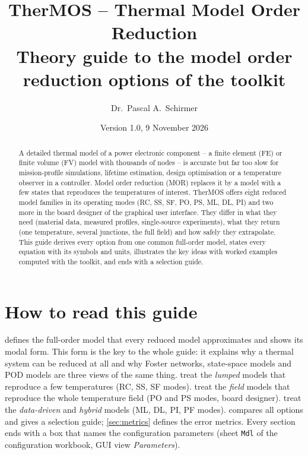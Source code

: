 \documentclass[11pt,a4paper]{article}
\title{\textbf{TherMOS -- Thermal Model Order Reduction}\\[0.3em]
  \large Theory guide to the model order reduction options of the toolkit}
\author{Dr.\ Pascal A.\ Schirmer}
\date{Version 1.0, 9 November 2026}
\newcommand{\cfg}[1]{\texttt{#1}}
\begin{document}
\maketitle

\begin{abstract}
\noindent
A detailed thermal model of a power electronic component -- a finite element (FE) or finite volume (FV) model with
thousands of nodes -- is accurate but far too slow for mission-profile simulations, lifetime estimation, design
optimisation or a temperature observer in a controller. Model order reduction (MOR) replaces it by a model with a few
states that reproduces the temperatures of interest. TherMOS offers eight reduced model families in its operating
modes (RC, SS, SF, PO, PS, ML, DL, PI) and two more in the board designer of the graphical user interface. They differ
in what they need (material data, measured profiles, single-source experiments), what they return (one temperature,
several junctions, the full field) and how safely they extrapolate. This guide derives every option from one common
full-order model, states every equation with its symbols and units, illustrates the key ideas with worked examples
computed with the toolkit, and ends with a selection guide.
\end{abstract}

\tableofcontents
\newpage

\section{How to read this guide}
 defines the full-order model that every reduced model approximates and shows its modal form. This form
is the key to the whole guide: it explains why a thermal system can be reduced at all and why Foster networks,
state-space models and POD models are three views of the same thing.  treat the
\emph{lumped} models that reproduce a few temperatures (RC, SS, SF modes).  treat the
\emph{field} models that reproduce the whole temperature field (PO and PS modes, board designer).
 treat the \emph{data-driven} and \emph{hybrid} models (ML, DL, PI, PF modes).
 compares all options and gives a selection guide; \cref{sec:metrics} defines the error metrics.
Every section ends with a box that names the configuration parameters (sheet \cfg{Mdl} of the configuration workbook,
GUI view \emph{Parameters}).
\end{document}
